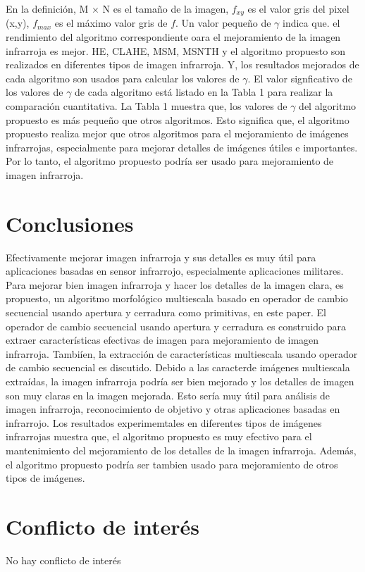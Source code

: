 \documentclass[a4paper, 11 pt, conference]{ieeeconf}      %
\begin{document}
En la definici\'on, M $\times$ N es el tamaño de la imagen, $f_{xy}$ es el valor gris del pixel (x,y), $f_{max}$ es el m\'aximo valor gris de $f$. Un valor pequeño de $\gamma$ indica que. el rendimiento del algoritmo correspondiente oara el mejoramiento de la imagen infrarroja es mejor.
HE, CLAHE, MSM, MSNTH y el algoritmo propuesto son realizados en diferentes tipos de imagen infrarroja. Y, los resultados mejorados de cada algoritmo son usados para calcular los valores de  $\gamma$. El valor signficativo de los valores de $\gamma$ de cada algoritmo est\'a listado en la Tabla 1 para realizar la comparaci\'on cuantitativa.
La Tabla 1 muestra que, los valores de $\gamma$ del algoritmo propuesto es m\'as pequeño que otros algoritmos. Esto significa que, el algoritmo propuesto realiza mejor que otros algoritmos para el mejoramiento de im\'agenes infrarrojas, especialmente para mejorar detalles de im\'agenes \'utiles e importantes. Por lo tanto, el algoritmo propuesto podr\'ia ser usado para mejoramiento de imagen infrarroja.
\section{Conclusiones}
Efectivamente mejorar imagen infrarroja y sus detalles es muy \'util para aplicaciones basadas en sensor infrarrojo, especialmente aplicaciones militares. Para mejorar bien imagen infrarroja y hacer los detalles de la imagen clara, es propuesto, un algoritmo morfol\'ogico multiescala basado en operador de cambio secuencial usando apertura y cerradura como primitivas, en este paper. El operador de cambio secuencial usando apertura y cerradura es construido para extraer caracter\'isticas efectivas de imagen para mejoramiento de imagen infrarroja. Tambi\'ien, la extracci\'on de caracter\'isticas multiescala usando operador de cambio secuencial es discutido. Debido a las caracter\isticas de im\'agenes multiescala extra\'idas, la imagen infrarroja podr\'ia ser bien mejorado y los detalles de imagen son muy claras en la imagen mejorada. Esto ser\'ia muy \'util para an\'alisis de imagen infrarroja, reconocimiento de objetivo y otras aplicaciones basadas en infrarrojo. Los resultados experimemtales en diferentes tipos de im\'agenes infrarrojas muestra que, el algoritmo propuesto es muy efectivo para el mantenimiento del mejoramiento de los detalles de la imagen infrarroja. Adem\'as, el algoritmo propuesto podr\'ia ser tambien usado para mejoramiento de otros tipos de im\'agenes.
\section*{\textbf{Conflicto de inter\'es}}
No hay conflicto de inter\'es
\end{document}
